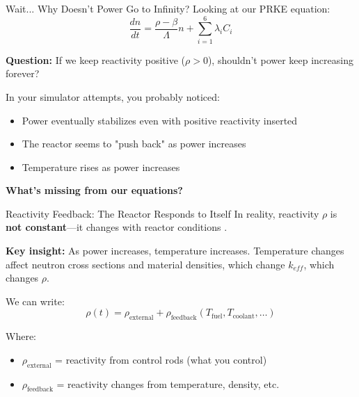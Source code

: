 \documentclass[aspectratio=169]{beamer}
\begin{document}
\begin{frame}[allowframebreaks]{Wait... Why Doesn't Power Go to Infinity?}
    Looking at our PRKE equation:
    $$ \frac{dn}{dt} = \frac{\rho - \beta}{\Lambda}n + \sum_{i=1}^{6} \lambda_i C_i $$

    \vspace{1em}
    \textbf{Question:} If we keep reactivity positive ($\rho > 0$), shouldn't power keep increasing forever?

    \vspace{1em}
    In your simulator attempts, you probably noticed:
    \begin{itemize}
        \item Power eventually stabilizes even with positive reactivity inserted
        \item The reactor seems to "push back" as power increases
        \item Temperature rises as power increases
    \end{itemize}

    \vspace{1em}
    \textbf{What's missing from our equations?}
\end{frame}

\begin{frame}[allowframebreaks]{Reactivity Feedback: The Reactor Responds to Itself}
    In reality, reactivity $\rho$ is \textbf{not constant}—it changes with reactor conditions \cite{bell1970nuclear,lamarsh2001introduction}.

    \vspace{1em}
    \textbf{Key insight:} As power increases, temperature increases. Temperature changes affect neutron cross sections and material densities, which change $k_{eff}$, which changes $\rho$.

    \vspace{1em}
    We can write:
    $$ \rho(t) = \rho_{\text{external}} + \rho_{\text{feedback}}(T_{\text{fuel}}, T_{\text{coolant}}, \ldots) $$

    Where:
    \begin{itemize}
        \item $\rho_{\text{external}}$ = reactivity from control rods (what you control)
        \item $\rho_{\text{feedback}}$ = reactivity changes from temperature, density, etc.
    \end{itemize}
\end{frame}
\end{document}
